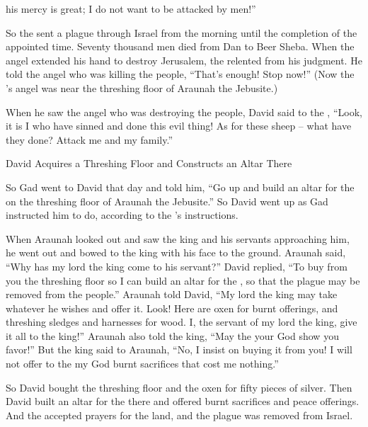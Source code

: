 {his mercy
is great;
I do not
want to be attacked
by men!”
\par }{\PP {}So the
{}
sent
a plague
through Israel
from the morning
until
the completion
of the appointed
time.
Seventy
thousand
men
died
from
Dan
to
Beer Sheba.
When
the angel
extended
his hand
to destroy
Jerusalem,
the {}
relented
from his judgment.
He told
the angel
who was killing
the people,
“That’s
enough! Stop now!” (Now the
{}’s
angel
was
near
the threshing floor
of Araunah
the Jebusite.)
\par }{\PP {}When he saw
the angel
who was destroying
the people,
David
said
to
the {}, “Look,
it is I
who have sinned
and done this evil thing! As for these
sheep
– what
have they done? Attack me
and my family.”
\par }{\SH David Acquires a Threshing Floor and Constructs an Altar There
\par }{\PP {}So Gad
went
to
David
that day
and told
him, “Go up
and build
an altar
for the
{}
on the threshing floor
of Araunah
the Jebusite.”
So David
went up
as
Gad
instructed
him to do, according to the
{}’s
instructions.
\par }{\PP {}When Araunah
looked
out and saw
the king
and his servants
approaching
him, he
went out
and bowed
to the king
with his face
to the ground.
Araunah
said,
“Why
has my lord
the king
come
to
his servant?” David
replied,
“To buy
from you
the
threshing floor
so I can build
an altar
for the
{}, so
that the plague
may be removed from the people.”
Araunah
told
David,
“My lord
the king
may take
whatever
he wishes
and offer it. Look! Here are oxen
for burnt offerings,
and threshing sledges
and harnesses
for wood.
I,
the servant of my lord the king,
give
it all
to the king!” Araunah
also told
the king,
“May the
{}
your God
show you favor!”
But the king
said
to
Araunah,
“No,
I insist on
buying
it from you! I will not
offer
to the
{}
my God
burnt sacrifices
that cost me nothing.”
\par }{\PP So David
bought
the threshing floor
and the oxen
for fifty
pieces
of silver.
Then David
built
an altar
for the
{}
there
and offered
burnt sacrifices
and peace offerings.
And the
{}
accepted prayers
for the land,
and the plague
was removed from Israel.
\par }